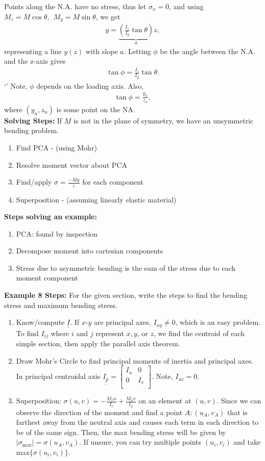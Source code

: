 \documentclass{article}
\numberwithin{equation}{subsection}
\newcommand{\m}[4]{\begin{bmatrix}
  #1 & #2\\
  #3 &#4\\
\end{bmatrix}}
\newcommand{\tensor}[1]{\underline{\underline{#1}}}
\begin{document}
Points along the N.A. have no stress, thus let $\sigma_x = 0$, and using
$M_z = M\cos\theta,~~ M_y = M\sin\theta$, we get
\begin{align*}
  y = \underbrace{\left(\frac{I_z}{I_y}\tan\theta\right)}_a z,
\end{align*}
representing a line $y(z)$ with slope $a$.
Letting $\phi$ be the angle between the N.A. and the z-axis gives
\begin{align*}
  \tan\phi = \frac{I_z}{I_y}\tan\theta.
\end{align*}`'
Note, $\phi$ depends on the loading axis. Also,
\begin{align*}
  \tan\phi = \frac{y_n}{z_n},
\end{align*}
where $(y_n, z_n)$ is some point on the NA.
\\

\textbf{Solving Steps:}
If ${\underline{M}}$ is not in the plane of symmetry, we have an unsymmetric bending problem.
\begin{enumerate}
  \item Find PCA - (using Mohr)
  \item Resolve moment vector about PCA
  \item Find/apply $\sigma = \frac{-My}{i}$ for each component
  \item Superposition - (assuming linearly elastic material)
\end{enumerate}

\textbf{Steps solving an example:}
\begin{enumerate}
  \item PCA: found by inspection
  \item Decompose moment into cartesian components
  \item Stress due to asymmetric bending is the sum of the stress due to each moment component
\end{enumerate}

\textbf{Example 8 Steps:} For the given section, write the steps to find the bending stress and maximum bending stress.
\begin{enumerate}
  \item Know/compute $\tensor{I}$. If $x$-$y$ are principal axes, $I_{xy}\neq0$, which is an easy problem.
  To find $I_{ij}$ where $i$ and $j$ represent $x,y$, or $z$, we find the centroid of each simple section, then apply the parallel axis theorem.
  \item Draw Mohr's Circle to find principal moments of inertia and principal axes. In principal centroidal axis $\tensor{I_p} = \m{I_u}{0}{0}{I_v}$.
  Note, $I_{uv}=0$.
  \item Superposition: $\sigma(u,v) = -\frac{M_v u}{I_v} + \frac{M_u v}{I_u}$ on an element at $(u,v)$.
  Since we can observe the direction of the moment and find a point $A: (u_A, v_A)$ that is farthest away from the neutral axis and causes each term in each direction to be of the same sign.
  Then, the max bending stress will be given by $|\sigma_{\text{max}}| = \sigma(u_A, v_A)$. If unsure, you can try multiple points $(u_i, v_i)$ and take max$\{\sigma(u_i,v_i)\}$.
\end{enumerate}
\end{document}
